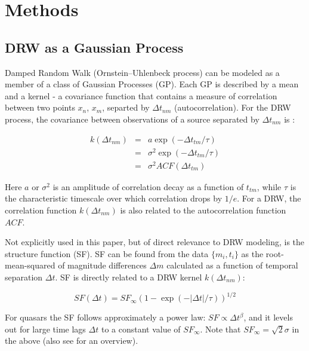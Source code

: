 \documentclass[twocolumn]{aastex62}
\begin{document}
\section{Methods}\label{sec:methods}
\subsection{DRW as a Gaussian Process}
Damped Random Walk (Ornstein–Uhlenbeck process) can be modeled as a member of a class of Gaussian Processes (GP). Each GP is described by a mean and a kernel - a covariance function that contains a measure of correlation between two points $x_{n}$, $x_{m}$, separted by $\Delta t_{nm}$ (autocorrelation). For the  DRW process, the covariance  between observations of a source separated by $\Delta t_{nm}$ is : 

\begin{eqnarray}
k(\Delta t_{nm}) &=& a \exp{(-\Delta t_{tm} / \tau)} \\
                 &=& \sigma^{2}\exp{(-\Delta t_{tm} / \tau)}  \\
                 &=& \sigma^{2} ACF(\Delta t_{tm})
\end{eqnarray} 

Here $a$ or $\sigma^{2}$ is an amplitude of correlation decay as a function of $t_{tm}$,  while $\tau$ is the characteristic timescale over which correlation drops by $1/e$. For a DRW,  the correlation function $k(\Delta t_{nm})$ is also related to the autocorrelation function $ACF$. 

Not explicitly used in this paper, but of direct relevance to DRW modeling, is the structure function (SF). SF can be found from the data $\{m_{i},t_{i}\}$ as the root-mean-squared of  magnitude differences $\Delta m$  calculated as a function of temporal separation $\Delta t$. SF is directly related to a DRW kernel $k(\Delta t_{nm})$:

\begin{equation}
SF(\Delta t) = SF_{\infty} (1-\exp{(-|\Delta t|/\tau)})^{1/2}
\end{equation}

For quasars the SF follows approximately a power law: $SF \propto \Delta t^{\beta}$,  and it levels out for large time lags $\Delta t$ to a constant value of $SF_{\infty}$.   Note that $SF_\infty = \sqrt{2} \sigma$  in the above (also see \citet{macleod2012, bauer2009, graham2015a} for an overview).
\end{document}
